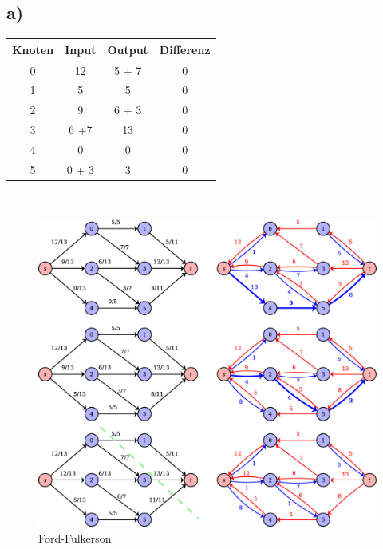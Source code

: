 \documentclass[a4paper,11pt,twoside]{scrartcl}
\begin{document}
\subsection*{a)} 




\begin{center}
	{\scriptsize\vspace{-20pt}
  \begin{tabular}{| c || c | c | c |}
    \hline
    Knoten & Input & Output & Differenz\\ \hline
    0 & 12     & 5 + 7 & 0 \\ \hline
    1 & 5       & 5       & 0 \\ \hline
    2 &  9      & 6 + 3 & 0 \\ \hline
    3 & 6 +7  & 13     & 0 \\ \hline
    4 & 0       & 0       & 0 \\ \hline
    5 & 0 + 3 & 3       & 0 \\ \hline
  \end{tabular}
}
\end{center}

$ $\\

\begin{figure}
	\centering
	\includegraphics[width=0.9\linewidth]{Grafik/Diagramm1}
	\caption{Ford-Fulkerson}
	\label{fig:Ford-Fulkerson}
	\vspace*{-120pt}
\end{figure}
\end{document}

